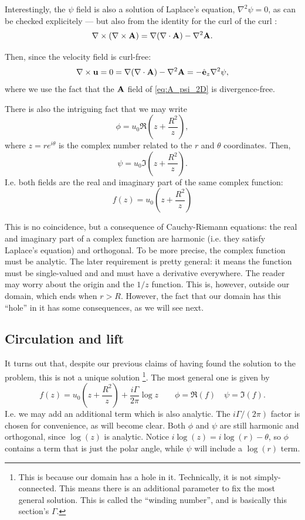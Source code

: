 Interestingly, the $\psi$ field is also a solution of Laplace's
equation, $\nabla^2 \psi=0$, as can be checked explicitely --- but
also from the identity for the curl of the curl
\cite{wiki:Vector_calculus_identities}:
\begin{equation}
  \label{eq:curl_of_curl}
  \nabla \times \left(\nabla \times \mathbf{A} \right)=
  \nabla (\nabla \cdot \mathbf {A} )-\nabla^2\mathbf{A} .
\end{equation}

Then, since the velocity field is curl-free:
\[
   \nabla \times \mathbf{u} = 0 =
   \nabla (\nabla \cdot \mathbf {A} )- \nabla^{2}\mathbf {A} =
   - \hat{\mathbf{e}}_z \nabla^{2} \psi,
\]
where we use the fact that the $\mathbf{A}$ field of \ref{eq:A_psi_2D} is
divergence-free.


There is also the intriguing fact that we may write
\[
\phi = u_0 \Re \left( z  + \frac{R^2}{z} \right) ,
\]
where $z=r e^{i\theta}$ is the complex number related to the $r$ and
$\theta$ coordinates. Then,
\[
\psi = u_0 \Im \left( z  + \frac{R^2}{z} \right) .
\]
%
I.e. both fields are the real and imaginary part of the same complex
function:
\[
f(z) = u_0 \left( z  + \frac{R^2}{z} \right)
\]

This is no coincidence, but a consequence of Cauchy-Riemann
equations: the real and imaginary part of a complex function are
harmonic (i.e. they satisfy Laplace's equation) and orthogonal. To be
more precise, the complex function must be analytic. The later
requirement is pretty general: it means the function must be
single-valued and and must have a derivative everywhere. The reader
may worry about the origin and the $1/z$ function. This is, however,
outside our domain, which ends when $r>R$. However, the fact that our
domain has this ``hole'' in it has some consequences, as we will see
next.


\subsection{Circulation and lift}

It turns out that, despite our previous claims of having found the
solution to the problem, this is not a unique solution%
\footnote{This is because our domain has a hole in it. Technically, it
  is not simply-connected. This means there is an additional parameter
  to fix the most general solution. This is called the ``winding
  number'', and is basically this section's $\Gamma$.}.
%
The most general one is given by
\[
 f(z) = u_0 \left( z + \frac{R^2}{z} \right)
 + \frac{i \Gamma}{2\pi} \log z \qquad
 \phi=\Re(f) \quad
 \psi=\Im(f) .
\]
I.e. we may add an additional term which is also analytic. The $i
\Gamma/(2\pi)$ factor is chosen for convenience, as will become
clear. Both $\phi$ and $\psi$ are still harmonic and orthogonal, since
$\log(z)$ is analytic. Notice $i \log(z)= i \log(r) - \theta$, so
$\phi$ contains a term that is just the polar angle, while $\psi$ will
include a $\log(r)$ term.

